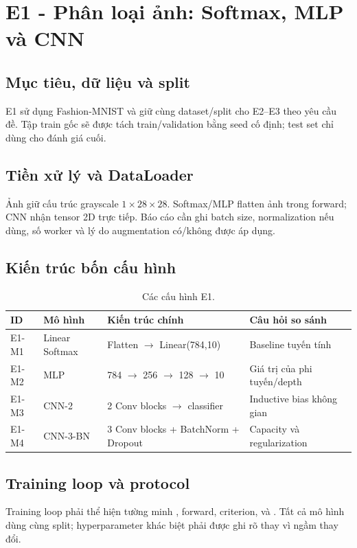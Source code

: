 \section{E1 - Phân loại ảnh: Softmax, MLP và CNN}

\subsection{Mục tiêu, dữ liệu và split}
E1 sử dụng Fashion-MNIST và giữ cùng dataset/split cho E2--E3 theo yêu cầu đề. Tập train gốc sẽ được tách train/validation bằng seed cố định; test set chỉ dùng cho đánh giá cuối.


\subsection{Tiền xử lý và DataLoader}
Ảnh giữ cấu trúc grayscale $1\times28\times28$. Softmax/MLP flatten ảnh trong forward; CNN nhận tensor 2D trực tiếp. Báo cáo cần ghi batch size, normalization nếu dùng, số worker và lý do augmentation có/không được áp dụng.

\subsection{Kiến trúc bốn cấu hình}
\begin{table}[H]\centering
\caption{Các cấu hình E1.}
\begin{tabularx}{\textwidth}{@{}lllX@{}}
\toprule
ID & Mô hình & Kiến trúc chính & Câu hỏi so sánh \\
\midrule
E1-M1 & Linear Softmax & Flatten $\rightarrow$ Linear(784,10) & Baseline tuyến tính \\
E1-M2 & MLP & 784 $\rightarrow$ 256 $\rightarrow$ 128 $\rightarrow$ 10 & Giá trị của phi tuyến/depth \\
E1-M3 & CNN-2 & 2 Conv blocks $\rightarrow$ classifier & Inductive bias không gian \\
E1-M4 & CNN-3-BN & 3 Conv blocks + BatchNorm + Dropout & Capacity và regularization \\
\bottomrule
\end{tabularx}
\end{table}

\subsection{Training loop và protocol}
Training loop phải thể hiện tường minh , forward, criterion,  và . Tất cả mô hình dùng cùng split; hyperparameter khác biệt phải được ghi rõ thay vì ngầm thay đổi.

